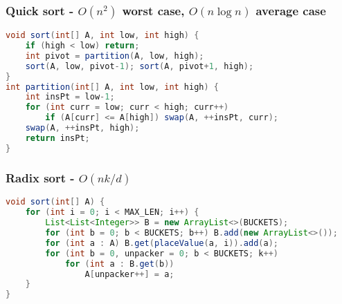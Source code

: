 \subsubsection{Quick sort - $O(n^2)$ worst case, $O(n\log n)$ average case}
\begin{lstlisting}[language=java]
void sort(int[] A, int low, int high) {
    if (high < low) return;
    int pivot = partition(A, low, high);
    sort(A, low, pivot-1); sort(A, pivot+1, high);
}
int partition(int[] A, int low, int high) {
    int insPt = low-1;
    for (int curr = low; curr < high; curr++)
        if (A[curr] <= A[high]) swap(A, ++insPt, curr);
    swap(A, ++insPt, high);
    return insPt;
}
\end{lstlisting}

\begin{comment}
\subsubsection{Count sort - $O(n+r)$}
Count frequencies of each element, then unpack.
\begin{lstlisting}[language=java]
void sort(int[] A) {
    if (A.length == 0) return;
    int min = Arrays.stream(A).min().getAsInt();
    int max = Arrays.stream(A).max().getAsInt();
    int[] counts = new int[max-min+1];
    for (int i : A) counts[i-min]++;
    
    int j = 0;
    for (int i=0; i < A.length; i++) {
        while (counts[j] == 0) j++;
        A[i] = min + j;
        counts[j]--;
    }
}
\end{lstlisting}
\end{comment}


\subsubsection{Radix sort - $O(nk/d)$}
\begin{lstlisting}[language=java]
void sort(int[] A) {                                  
    for (int i = 0; i < MAX_LEN; i++) {
        List<List<Integer>> B = new ArrayList<>(BUCKETS);                  
        for (int b = 0; b < BUCKETS; b++) B.add(new ArrayList<>());
        for (int a : A) B.get(placeValue(a, i)).add(a);
        for (int b = 0, unpacker = 0; b < BUCKETS; k++)
            for (int a : B.get(b))
                A[unpacker++] = a;                           
    }
}
\end{lstlisting}

